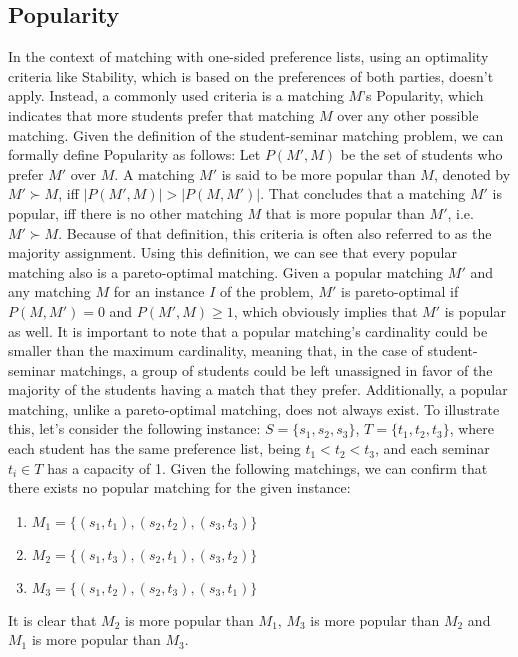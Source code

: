 \subsection{Popularity}
In the context of matching with one-sided preference lists, using an optimality criteria like Stability, which is based on the preferences of both parties, doesn't apply. Instead, a commonly used criteria is a matching $M$'s Popularity, which indicates that more students prefer that matching $M$ over any other possible matching.\cite{ManlovePopularMatchings} Given the definition of the student-seminar matching problem, we can formally define Popularity as follows:
Let $P(M', M)$ be the set of students who prefer $M'$ over $M$. A matching $M'$ is said to be more popular than $M$, denoted by $M' \succ M$, iff $|P(M', M)| > |P(M, M')|$. That concludes that a matching $M'$ is popular, iff there is no other matching $M$ that is more popular than $M'$, i.e. $M' \succ M$.\cite{Klaus, AbrahamPopular} Because of that definition, this criteria is often also referred to as the majority assignment.\cite{Gardenfors}
\newline
Using this definition, we can see that every popular matching also is a pareto-optimal matching. Given a popular matching $M'$ and any matching $M$ for an instance $I$ of the problem, $M'$ is pareto-optimal if $P(M, M') = 0$ and $P(M', M) \geq 1$, which obviously implies that $M'$ is popular as well.\cite{Klaus}
\newline
It is important to note that a popular matching's cardinality could be smaller than the maximum cardinality, meaning that, in the case of student-seminar matchings, a group of students could be left unassigned in favor of the majority of the students having a match that they prefer.
Additionally, a popular matching, unlike a pareto-optimal matching, does not always exist. To illustrate this, let's consider the following instance: $S=\{s_1, s_2, s_3\}$, $T=\{t_1, t_2, t_3\}$, where each student has the same preference list, being $t_1 < t_2 < t_3$, and each seminar $t_i \in T$ has a capacity of 1. Given the following matchings, we can confirm that there exists no popular matching for the given instance: 
\begin{enumerate}
    \item $M_1=\{(s_1, t_1), (s_2, t_2), (s_3, t_3)\}$
    \item $M_2=\{(s_1, t_3), (s_2, t_1), (s_3, t_2)\}$
    \item $M_3=\{(s_1, t_2), (s_2, t_3), (s_3, t_1)\}$
\end{enumerate}
It is clear that $M_2$ is more popular than $M_1$, $M_3$ is more popular than $M_2$ and $M_1$ is more popular than $M_3$.\cite{AbrahamPopular}

